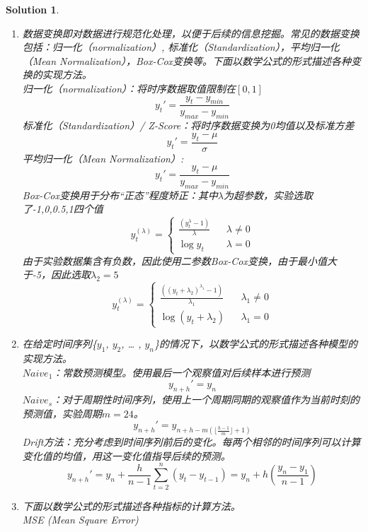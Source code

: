 \documentclass[a4paper,UTF8]{article}
\numberwithin{equation}{section}
\newtheorem*{mySol}{Solution}
\begin{document}
\begin{mySol}
		\begin{enumerate}[ {(}1{)}]
			\item 数据变换即对数据进行规范化处理，以便于后续的信息挖掘。常见的数据变换包括：归一化（normalization）, 标准化（Standardization），平均归一化（Mean Normalization），Box-Cox变换等。下面以数学公式的形式描述各种变换的实现方法。\\
			归一化（normalization）：将时序数据取值限制在$[0,1]$\\
			$$y_t'=\frac{y_t-y_{min}}{y_{max}-y_{min}}$$
			标准化（Standardization）/ Z-Score：将时序数据变换为0均值以及标准方差\\
			$$y_t'=\frac{y_t-\mu}{\sigma}$$
			平均归一化（Mean Normalization）:\\
			$$y_t'=\frac{y_t-\mu}{y_{max}-y_{min}}$$
			Box-Cox变换用于分布“正态”程度矫正：其中$\lambda$为超参数，实验选取了-1,0,0.5,1四个值\\
			$$ y_t^{(\lambda)} =\left\{
			\begin{array}{lcl}
			\frac{(y_t^\lambda-1)}{\lambda}       &      & {\lambda \neq 0}\\
			\log y_t     &      & {\lambda = 0}
			\end{array} \right. $$
			由于实验数据集含有负数，因此使用二参数Box-Cox变换，由于最小值大于-5，因此选取$\lambda_2=5$\\
			$$ y_t^{(\lambda)} =\left\{
			\begin{array}{lcl}
			\frac{((y_t+\lambda_2)^{\lambda_1}-1)}{\lambda_1}       &      & {\lambda_1 \neq 0}\\
			\log (y_t + \lambda_2)     &      & {\lambda_1 = 0}
			\end{array} \right. $$
			\item 在给定时间序列\{$y_1$, $y_2$, … , $y_n$\}的情况下，以数学公式的形式描述各种模型的实现方法。\\
			$Naive_1$：常数预测模型。使用最后一个观察值对后续样本进行预测\\
			$$ y_{n+h}' = y_n $$
			$Naive_s$：对于周期性时间序列，使用上一个周期同期的观察值作为当前时刻的预测值，实验周期$m=24$。
			$$ y_{n+h}' = y_{n+h-m(\lfloor \frac{h-1}{m} \rfloor + 1)} $$
			Drift方法：充分考虑到时间序列前后的变化。每两个相邻的时间序列可以计算变化值的均值，用这一变化值指导后续的预测。
			$$ y_{n+h}' = y_n + \frac{h}{n - 1}\sum_{t=2}^n(y_t - y_{t - 1})=y_n+h(\frac{y_n-y_1}{n -1}) $$
			\item 下面以数学公式的形式描述各种指标的计算方法。\\
			MSE (Mean Square Error)\\

\end{enumerate}
\end{mySol}
\end{document}
